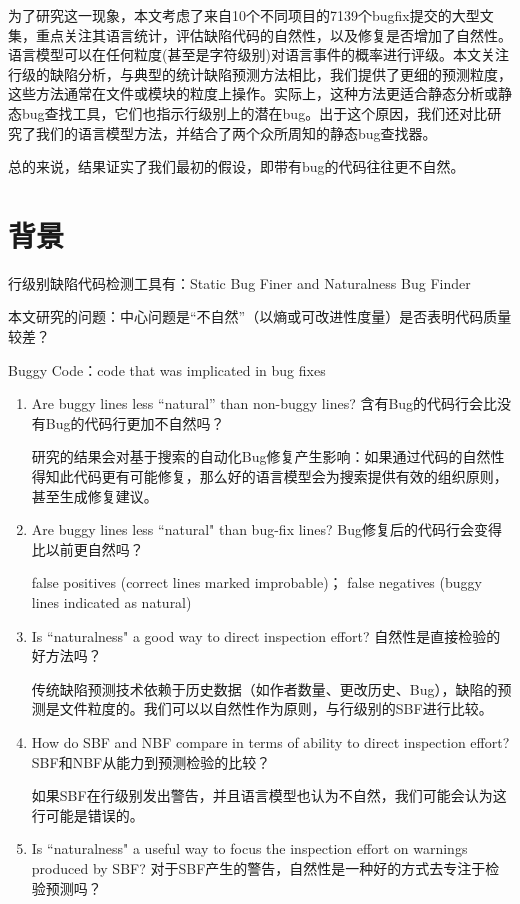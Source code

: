 \documentclass[a4paper]{article}
\begin{document}
为了研究这一现象，本文考虑了来自10个不同项目的7139个bugfix提交的大型文集，重点关注其语言统计，评估缺陷代码的自然性，以及修复是否增加了自然性。语言模型可以在任何粒度(甚至是字符级别)对语言事件的概率进行评级。本文关注行级的缺陷分析，与典型的统计缺陷预测方法相比，我们提供了更细的预测粒度，这些方法通常在文件或模块的粒度上操作。实际上，这种方法更适合静态分析或静态bug查找工具，它们也指示行级别上的潜在bug。出于这个原因，我们还对比研究了我们的语言模型方法，并结合了两个众所周知的静态bug查找器。

总的来说，结果证实了我们最初的假设，即带有bug的代码往往更不自然。

\section{背景}

行级别缺陷代码检测工具有：Static Bug Finer and Naturalness Bug Finder

本文研究的问题：中心问题是“不自然”（以熵或可改进性度量）是否表明代码质量较差？

Buggy Code：code that was implicated in bug ﬁxes

\begin{enumerate}
\item Are buggy lines less “natural” than non-buggy lines? 含有Bug的代码行会比没有Bug的代码行更加不自然吗？

研究的结果会对基于搜索的自动化Bug修复产生影响：如果通过代码的自然性得知此代码更有可能修复，那么好的语言模型会为搜索提供有效的组织原则，甚至生成修复建议。
\item Are buggy lines less “natural" than bug-ﬁx lines? Bug修复后的代码行会变得比以前更自然吗？

false positives (correct lines marked improbable)；
false negatives (buggy lines indicated as natural)
\item Is “naturalness" a good way to direct inspection effort? 自然性是直接检验的好方法吗？

传统缺陷预测技术依赖于历史数据（如作者数量、更改历史、Bug），缺陷的预测是文件粒度的。我们可以以自然性作为原则，与行级别的SBF进行比较。
\item How do SBF and NBF compare in terms of ability to direct inspection effort? SBF和NBF从能力到预测检验的比较？

如果SBF在行级别发出警告，并且语言模型也认为不自然，我们可能会认为这行可能是错误的。

\item Is “naturalness" a useful way to focus the inspection effort on warnings produced by SBF? 对于SBF产生的警告，自然性是一种好的方式去专注于检验预测吗？

\end{enumerate}
\end{document}
